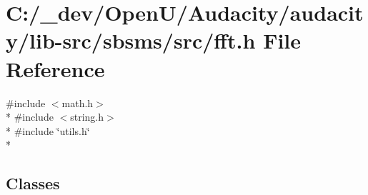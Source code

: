 \hypertarget{lib-src_2sbsms_2src_2fft_8h}{}\section{C\+:/\+\_\+dev/\+Open\+U/\+Audacity/audacity/lib-\/src/sbsms/src/fft.h File Reference}
\label{lib-src_2sbsms_2src_2fft_8h}
{\ttfamily \#include $<$math.\+h$>$}\\*
{\ttfamily \#include $<$string.\+h$>$}\\*
{\ttfamily \#include \char`\"{}utils.\+h\char`\"{}}\\*
\subsection*{Classes}
